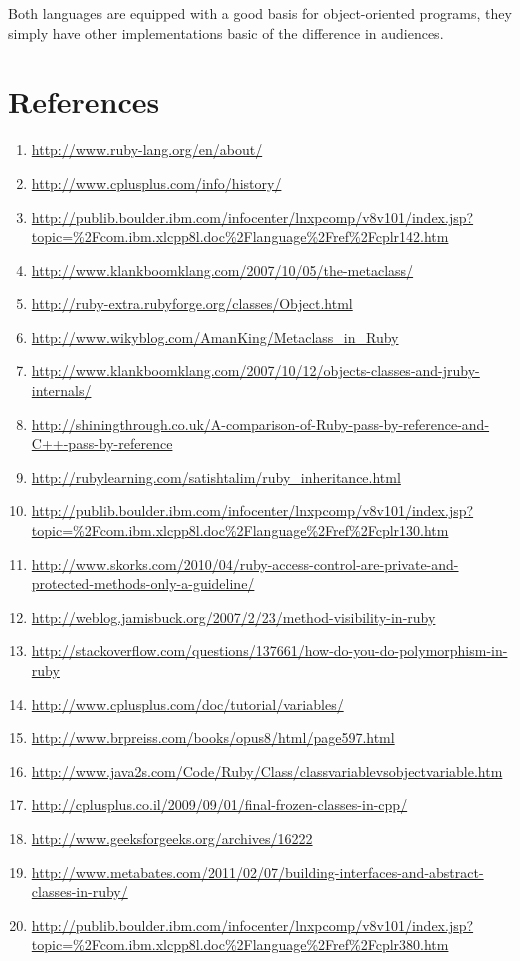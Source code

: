 \documentclass[10pt,a4paper,twocolumn]{article}
\begin{document}
Both languages are equipped with a good basis for object-oriented programs, they simply have other implementations basic of the difference in audiences.

\section{References}
\begin{enumerate}
\item \url{http://www.ruby-lang.org/en/about/}
\item \url{http://www.cplusplus.com/info/history/}
\item \url{http://publib.boulder.ibm.com/infocenter/lnxpcomp/v8v101/index.jsp?topic=\%2Fcom.ibm.xlcpp8l.doc\%2Flanguage\%2Fref\%2Fcplr142.htm}
\item \url{http://www.klankboomklang.com/2007/10/05/the-metaclass/}
\item \url{http://ruby-extra.rubyforge.org/classes/Object.html}
\item \url{http://www.wikyblog.com/AmanKing/Metaclass_in_Ruby}
\item \url{http://www.klankboomklang.com/2007/10/12/objects-classes-and-jruby-internals/}
\item \url{http://shiningthrough.co.uk/A-comparison-of-Ruby-pass-by-reference-and-C++-pass-by-reference}
\item \url{http://rubylearning.com/satishtalim/ruby_inheritance.html}
\item \url{http://publib.boulder.ibm.com/infocenter/lnxpcomp/v8v101/index.jsp?topic=\%2Fcom.ibm.xlcpp8l.doc\%2Flanguage\%2Fref\%2Fcplr130.htm}
\item \url{http://www.skorks.com/2010/04/ruby-access-control-are-private-and-protected-methods-only-a-guideline/}
\item \url{http://weblog.jamisbuck.org/2007/2/23/method-visibility-in-ruby}
\item \url{http://stackoverflow.com/questions/137661/how-do-you-do-polymorphism-in-ruby}
\item \url{http://www.cplusplus.com/doc/tutorial/variables/}
\item \url{http://www.brpreiss.com/books/opus8/html/page597.html}
\item \url{http://www.java2s.com/Code/Ruby/Class/classvariablevsobjectvariable.htm}
\item \url{http://cplusplus.co.il/2009/09/01/final-frozen-classes-in-cpp/}
\item \url{http://www.geeksforgeeks.org/archives/16222}
\item \url{http://www.metabates.com/2011/02/07/building-interfaces-and-abstract-classes-in-ruby/}
\item \url{http://publib.boulder.ibm.com/infocenter/lnxpcomp/v8v101/index.jsp?topic=\%2Fcom.ibm.xlcpp8l.doc\%2Flanguage\%2Fref\%2Fcplr380.htm}
\end{enumerate}
\end{document}
